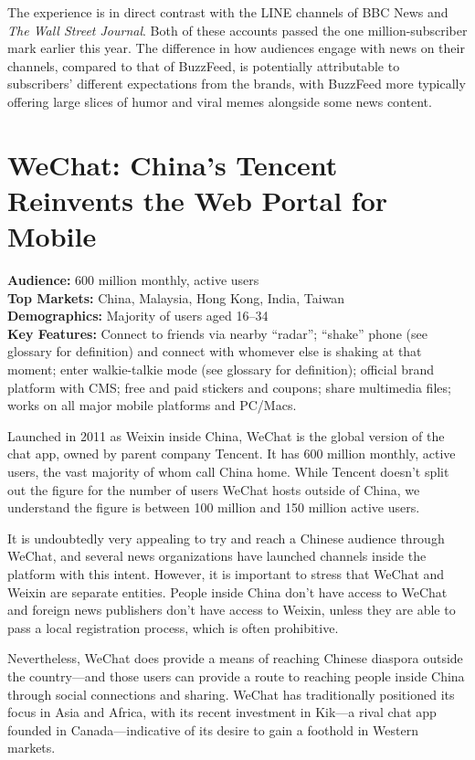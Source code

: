\documentclass[notoc, symmetric, nobib, nols]{towcenter-guideto-book}
\begin{document}
The experience is in direct contrast with the LINE channels of BBC News and \textit{The Wall Street Journal}. Both of these accounts passed the one million-subscriber mark earlier this year. The difference in how audiences engage with news on their channels, compared to that of BuzzFeed, is potentially attributable to subscribers' different expectations from the brands, with BuzzFeed more typically offering large slices of humor and viral memes alongside some news content.

\section{WeChat: China's Tencent Reinvents the Web Portal for Mobile}

\begin{framed}
\noindent\textbf{Audience:} 600 million monthly, active users\\
\noindent\textbf{Top Markets:} China, Malaysia, Hong Kong, India, Taiwan\\
\noindent\textbf{Demographics:} Majority of users aged 16--34\\
\noindent\textbf{Key Features:} Connect to friends via nearby ``radar''; ``shake'' phone (see glossary for definition) and connect with whomever else is shaking at that moment; enter walkie-talkie mode (see glossary for definition); official brand platform with CMS; free and paid stickers and coupons; share multimedia files; works on all major mobile platforms and PC/Macs.
\end{framed}
\vspace{\baselineskip}
Launched in 2011 as Weixin inside China, WeChat is the global version of the chat app, owned by parent company Tencent. It has 600 million monthly, active users,\autocite{TencentResults} the vast majority of whom call China home. While Tencent doesn't split out the figure for the number of users WeChat hosts outside of China, we understand the figure is between 100 million and 150 million active users.

It is undoubtedly very appealing to try and reach a Chinese audience through WeChat, and several news organizations have launched channels inside the platform with this intent. However, it is important to stress that WeChat and Weixin are separate entities. People inside China don't have access to WeChat and foreign news publishers don't have access to Weixin, unless they are able to pass a local registration process, which is often prohibitive.

Nevertheless, WeChat does provide a means of reaching Chinese diaspora outside the country---and those users can provide a route to reaching people inside China through social connections and sharing. WeChat has traditionally positioned its focus in Asia and Africa, with its recent investment in Kik---a rival chat app founded in Canada---indicative of its desire to gain a foothold in Western markets.
\end{document}

